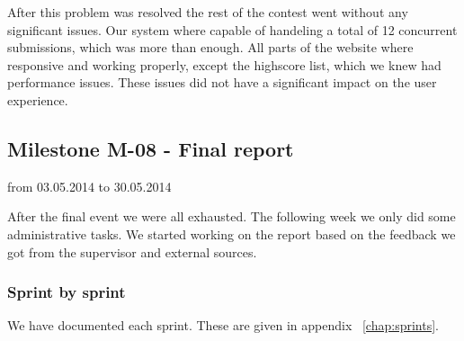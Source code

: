 After this problem was resolved the rest of the contest went without any
significant issues. Our system where capable of handeling a total of 12
concurrent submissions, which was more than enough. All parts of the website where
responsive and working properly, except the highscore list, which we
knew had performance issues. These issues did not have a significant
impact on the user experience.

\pagebreak
\subsection{Milestone M-08 - Final report}
\label{sec:M08}
from 03.05.2014 to 30.05.2014

After the final event we were all exhausted. The following week we only
did some administrative tasks. We started working on the report based on 
the feedback we got from the supervisor and external sources. 

\subsubsection{Sprint by sprint}
We have documented each sprint. These are given in appendix
~\ref{chap:sprints}. %
